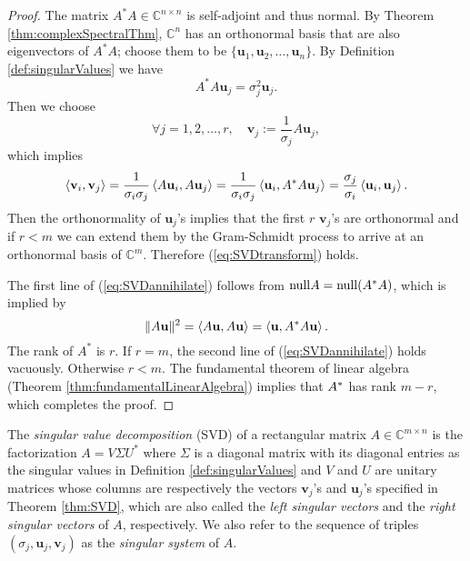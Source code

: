 \begin{proof}
  The matrix $A^*A\in \mathbb{C}^{n\times n}$
  is self-adjoint and thus normal.
  By Theorem \ref{thm:complexSpectralThm}, 
  $\mathbb{C}^{n}$ has an orthonormal basis
  that are also eigenvectors of $A^*A$; 
  choose them to be
  $\{\mathbf{u}_1, \mathbf{u}_2, \ldots, \mathbf{u}_n\}$.
  By Definition \ref{def:singularValues} we have
  \begin{displaymath}
    A^* A \mathbf{u}_j = \sigma_j^2 \mathbf{u}_j.
  \end{displaymath}
  Then we choose %
  \begin{displaymath}
    \forall j=1,2,\ldots,r, \quad
    \mathbf{v}_j := \frac{1}{\sigma_j} A \mathbf{u}_j,
  \end{displaymath}
  which implies
  \begin{displaymath}
    \innerProd{\mathbf{v}_i, \mathbf{v}_j}
    = \frac{1}{\sigma_i\sigma_j}
    \innerProd{A\mathbf{u}_i, A \mathbf{u}_j}
    = \frac{1}{\sigma_i\sigma_j}
    \innerProd{\mathbf{u}_i, A^*A \mathbf{u}_j}
    = \frac{\sigma_j}{\sigma_i}
    \innerProd{\mathbf{u}_i, \mathbf{u}_j}. %
  \end{displaymath}
  Then the orthonormality of $\mathbf{u}_j$'s
  implies that the first $r$ $\mathbf{v}_j$'s
  are orthonormal and if $r<m$ we can extend them
  by the Gram-Schmidt process
  to arrive at an orthonormal basis of $\mathbb{C}^m$.
  Therefore (\ref{eq:SVDtransform}) holds.

  The first line of (\ref{eq:SVDannihilate}) follows from
  $\mathrm{null} A = \mathrm{null} (A^* A)$, which is implied by
  \begin{displaymath}
    \|A\mathbf{u}\|^2=\left\langle A\mathbf{u}, A\mathbf{u} \right\rangle
    = \left\langle \mathbf{u}, A^*A\mathbf{u} \right\rangle.
  \end{displaymath}
  The rank of $A^*$ is $r$. 
  If $r=m$,
  the second line of (\ref{eq:SVDannihilate}) holds vacuously.
  Otherwise $r<m$. The fundamental theorem of linear algebra
  (Theorem \ref{thm:fundamentalLinearAlgebra}) implies that
  $\null A^*$ has rank $m-r$, which completes the proof.  
\end{proof}

\begin{defn}
  \label{def:SVD}
  The \emph{singular value decomposition} (SVD)
  of a rectangular matrix $A\in \mathbb{C}^{m\times n}$
  is the factorization $A=V\Sigma U^*$
  where $\Sigma$ is a diagonal matrix
  with its diagonal entries as the singular values
  in Definition \ref{def:singularValues}
  and $V$ and $U$ are unitary matrices whose columns
  are respectively the vectors $\mathbf{v}_j$'s and $\mathbf{u}_j$'s
  specified in Theorem \ref{thm:SVD}, 
  which are also called the \emph{left singular vectors}
  and the \emph{right singular vectors} of $A$,
  respectively.
  We also refer to the sequence of triples
  $(\sigma_j,\mathbf{u}_j,\mathbf{v}_j)$
  as the \emph{singular system} of $A$.
\end{defn}

